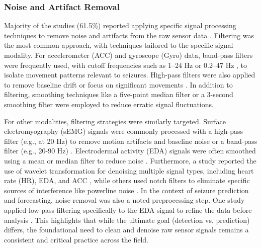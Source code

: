 \subsubsection{Noise and Artifact Removal}
Majority of the studies (61.5\%) reported applying specific signal processing techniques to remove noise and artifacts from the raw sensor data \cite{Milosevic2016-ee, De_Cooman2018-pq, Wu2024-yl, Li2022-ty, Wang2025-my, Hamlin2021-sd, Chowdhury2022-bi, Gheryani2017-yg, Ge2023-ab, Xu2022-tx, Wang2025-ql, Jiang2022-zu, Yu2023-ss, Dong2022-oo, Vakilna2024-hk, Hegarty-Craver2021-hk}. Filtering was the most common approach, with techniques tailored to the specific signal modality. For accelerometer (ACC) and gyroscope (Gyro) data, band-pass filters were frequently used, with cutoff frequencies such as 1–24 Hz \cite{Wu2024-yl} or 0.2–47 Hz \cite{De_Cooman2018-pq}, to isolate movement patterns relevant to seizures. High-pass filters were also applied to remove baseline drift or focus on significant movements \cite{Milosevic2016-ee, Li2022-ty, Vakilna2024-hk, Wang2025-my}. In addition to filtering, smoothing techniques like a five-point median filter \cite{Xu2022-tx} or a 3-second smoothing filter \cite{Cogan2017-lg} were employed to reduce erratic signal fluctuations.

For other modalities, filtering strategies were similarly targeted. Surface electromyography (sEMG) signals were commonly processed with a high-pass filter (e.g., at 20 Hz) to remove motion artifacts and baseline noise \cite{Milosevic2016-ee, De_Cooman2018-pq, Li2022-ty} or a band-pass filter (e.g., 20-90 Hz) \cite{Wu2024-yl}. Electrodermal activity (EDA) signals were often smoothed using a mean or median filter to reduce noise \cite{Li2022-ty, Wang2025-ql, Yu2023-ss}. Furthermore, a study reported the use of wavelet transformation for denoising multiple signal types, including heart rate (HR), EDA, and ACC \cite{Jiang2022-zu}, while others used notch filters to eliminate specific sources of interference like powerline noise \cite{Milosevic2016-ee, Hamlin2021-sd}.
In the context of seizure prediction and forecasting, noise removal was also a noted preprocessing step. One study applied low-pass filtering specifically to the EDA signal to refine the data before analysis \cite{Vieluf2023-ta}. This highlights that while the ultimate goal (detection vs. prediction) differs, the foundational need to clean and denoise raw sensor signals remains a consistent and critical practice across the field.


